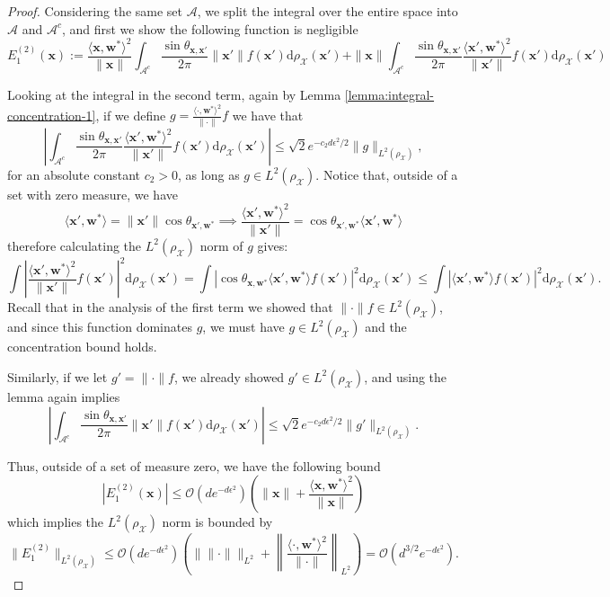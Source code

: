 \begin{proof}
    Considering the same set $\mathcal A$, we split the integral over the entire space into $\mathcal A$ and $\mathcal A^c$, and first we show the following function is negligible
    \[
        E^{(2)}_1 (\bm x) := \frac{\langle \bm x, \bm w^*\rangle^2}{\|\bm x\|}\int_{\mathcal A^c} \frac{\sin \theta_{\bm x, \bm x'}}{2\pi}\|\bm x'\| f(\bm x')\mathrm d\rho_{\mathcal X}(\bm x') + \|\bm x\|\int_{\mathcal A^c} \frac{\sin \theta_{\bm x, \bm x'}}{2\pi}\frac{\langle \bm x', \bm w^*\rangle^2}{\|\bm x'\|} f(\bm x')\mathrm d\rho_{\mathcal X}(\bm x')
    \]

    Looking at the integral in the second term, again by Lemma  \ref{lemma:integral-concentration-1}, if we define $g = \frac{\langle \cdot, \bm w^*\rangle ^2}{\|\bm \cdot\|}f$ we have that
    \[
        \left|\int_{\mathcal A^c} \frac{\sin \theta_{\bm x, \bm x'}}{2\pi} {\frac{\langle \bm x', \bm w^*\rangle ^2}{\|\bm x'\|} f(\bm x') }\mathrm d \rho_{\mathcal X}(\bm x')\right| \leq \sqrt 2e^{-c_2d\epsilon^2/2}\|g\|_{L^2(\rho_{\mathcal X})},
    \]
    for an absolute constant $c_2 > 0$, as long as $g \in L^2(\rho_{\mathcal X}).$ Notice that, outside of a set with zero measure, we have
    \[
        \langle \bm x', \bm w^*\rangle = \|\bm x'\| \cos \theta_{\bm x', \bm w^*} \implies \frac{\langle \bm x', \bm w^*\rangle ^2}{\|\bm x'\|} = \cos \theta_{\bm x', \bm w^*} \langle \bm x', \bm w^*\rangle
    \]
    therefore calculating the $L^2(\rho_\mathcal X)$ norm of $g$ gives:
    \[
        \int \left|\frac{\langle \bm x', \bm w^*\rangle ^2}{\|\bm x'\|} f(\bm x')\right|^2 \mathrm d \rho_{\mathcal X}(\bm x')= \int \left| \cos \theta_{\bm x, \bm w^*} \langle \bm x', \bm w^*\rangle f(\bm x')\right|^2 \mathrm d \rho_{\mathcal X}(\bm x') \leq \int \left| \langle \bm x', \bm w^*\rangle f(\bm x')\right|^2 \mathrm d \rho_{\mathcal X}(\bm x').
    \]
    Recall that in the analysis of the first term we showed that $\|\cdot \|f \in L^2(\rho_{\mathcal X})$, and since this function dominates $g$, we must have $g \in L^2(\rho_{\mathcal X})$ and the concentration bound holds.
    
    Similarly, if we let $g' = \|\cdot \| f$, we already showed $g' \in L^2(\rho_{\mathcal X})$, and using the lemma again implies
    \[
        \left|\int_{\mathcal A^c} \frac{\sin \theta_{\bm x, \bm x'}}{2\pi} \|\bm x'\|f(\bm x')\mathrm d \rho_{\mathcal X}(\bm x')\right| \leq \sqrt 2e^{-c_2d\epsilon^2/2}\|g'\|_{L^2(\rho_{\mathcal X})}.
    \]
    
    Thus, outside of a set of measure zero, we have the following bound
    \[
        |E_1^{(2)}(\bm x)| \leq \mathcal O(de^{-d \epsilon^2})\left(\|\bm x\| + \frac{\langle \bm x, \bm w^*\rangle ^2}{\|\bm x\|}\right)
    \]
    which implies the $L^2(\rho_{\mathcal X})$ norm is bounded by
    \[
        \|E_1^{(2)}\|_{L^2(\rho_{\mathcal X})} \leq  \mathcal O(de^{-d \epsilon^2})\left(\Big\|\|\cdot\|\Big\|_{L^2} +\left\|\frac{\langle \cdot, \bm w^*\rangle ^2}{\|\cdot\|}\right\|_{L^2} \right) = \mathcal O(d^{3/2} e^{-d\epsilon^2}).
    \]
    

\end{proof}
